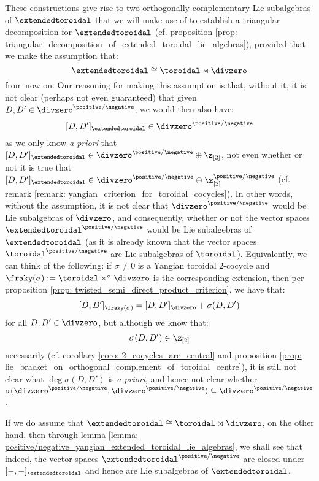         \begin{remark}[Why must we work only with $\extendedtoroidal := \toroidal \rtimes \divzero$ ?] \label{remark: why_yangian_toroidal_semi_direct_product}
            These constructions give rise to two orthogonally complementary Lie subalgebras of $\extendedtoroidal$ that we will make use of to establish a triangular decomposition for $\extendedtoroidal$ (cf. proposition \ref{prop: triangular_decomposition_of_extended_toroidal_lie_algebras}), provided that we make the assumption that:
                $$\extendedtoroidal \cong \toroidal \rtimes \divzero$$
            from now on. Our reasoning for making this assumption is that, without it, it is not clear (perhaps not even guaranteed) that given $D, D' \in \divzero^{\positive/\negative}$, we would then also have:
                $$[D, D']_{\extendedtoroidal} \in \divzero^{\positive/\negative}$$
            as we only know \textit{a priori} that $[D, D']_{\extendedtoroidal} \in \divzero^{\positive/\negative} \oplus \z_{[2]}$, not even whether or not it is true that $[D, D']_{\extendedtoroidal} \in \divzero^{\positive/\negative} \oplus \z_{[2]}^{\positive/\negative}$ (cf. remark \ref{remark: yangian_criterion_for_toroidal_cocycles}). In other words, without the assumption, it is not clear that $\divzero^{\positive/\negative}$ would be Lie subalgebras of $\divzero$, and consequently, whether or not the vector spaces $\extendedtoroidal^{\positive/\negative}$ would be Lie subalgebras of $\extendedtoroidal$ (as it is already known that the vector spaces $\toroidal^{\positive/\negative}$ are Lie subalgebras of $\toroidal$). Equivalently, we can think of the following: if $\sigma \not = 0$ is a Yangian toroidal $2$-cocycle and $\fraky(\sigma) := \toroidal \rtimes^{\sigma} \divzero$ is the corresponding extension, then per proposition \ref{prop: twisted_semi_direct_product_criterion}, we have that:
                $$[D, D']_{\fraky(\sigma)} = [D, D']_{\divzero} + \sigma(D, D')$$
            for all $D, D' \in \divzero$, but although we know that:
                $$\sigma(D, D') \in \z_{[2]}$$
            necessarily (cf. corollary \ref{coro: 2_cocycles_are_central} and proposition \ref{prop: lie_bracket_on_orthogonal_complement_of_toroidal_centre}), it is still not clear what $\deg \sigma(D, D')$ is \textit{a priori}, and hence not clear whether $\sigma(\divzero^{\positive/\negative}, \divzero^{\positive/\negative}) \subseteq \divzero^{\positive/\negative}$.
            
            If we do assume that $\extendedtoroidal \cong \toroidal \rtimes \divzero$, on the other hand, then through lemma \ref{lemma: positive/negative_yangian_extended_toroidal_lie_algebras}, we shall see that indeed, the vector spaces $\extendedtoroidal^{\positive/\negative}$ are closed under $[-, -]_{\extendedtoroidal}$ and hence are Lie subalgebras of $\extendedtoroidal$. 
        \end{remark}
        
